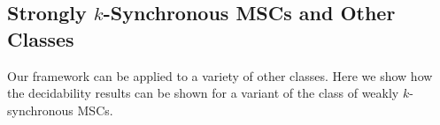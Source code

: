 \documentclass[a4paper,UKenglish,cleveref, autoref, thm-restate]{lipics-v2021}
\begin{document}
%
%
%
%
%
%
%
%
%

\subsection{Strongly $k$-Synchronous MSCs and Other Classes}\label{sec:strong-sync}
Our framework can be applied to a variety of other classes. Here we show how the decidability results can be shown for a variant of the class of weakly $k$-synchronous MSCs.
\end{document}
